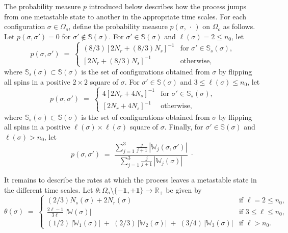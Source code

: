 \documentclass[reqno]{amsart}
\begin{document}
The probability measure $p$ introduced below describes how the process
jumps from one metastable state to another in the appropriate time
scales.  For each configuration $\sigma \in \Omega_o$, define the
probability measure $p(\sigma, \,\cdot\,)$ on $\Omega_o$ as follows.
Let $p(\sigma, \sigma')=0$ for $\sigma'\not\in {{\mathbb S}}(\sigma)$. For
$\sigma'\in {{\mathbb S}}(\sigma)$ and $\ell (\sigma) =2 \le n_0$, let
\begin{equation}
\label{e04}
p(\sigma, \sigma') \;=\;
\begin{cases}
(8/3) [2 N_r + (8/3) N_s]^{-1} & \text{for $\sigma' \in {{\mathbb S}}_s(\sigma)$,} \\
[2 N_r + (8/3) N_s]^{-1} & \text{otherwise,}
\end{cases}
\end{equation}
where ${{\mathbb S}}_s(\sigma) \subset {{\mathbb S}}(\sigma)$ is the set of
configurations obtained from $\sigma$ by flipping all spins in a
positive $2\times 2$ square of $\sigma$. For $\sigma'\in {{\mathbb S}}(\sigma)$ and $3\le \ell (\sigma) \le n_0$, let
\begin{equation}
\label{e05}
p(\sigma, \sigma') \;=\; 
\begin{cases}
4[2 N_r + 4 N_s]^{-1} & \text{for $\sigma' \in {{\mathbb S}}_s(\sigma)$,} \\
[2 N_r + 4 N_s]^{-1} & \text{otherwise,}
\end{cases} 
\end{equation}
where ${{\mathbb S}}_s(\sigma) \subset {{\mathbb S}}(\sigma)$ is the set of
configurations obtained from $\sigma$ by flipping all spins in a
positive $\ell(\sigma)\times \ell(\sigma)$ square of $\sigma$.
Finally, for $\sigma'\in {{\mathbb S}}(\sigma)$ and $\ell(\sigma)>n_0$, let
\begin{equation}
\label{e06}
p(\sigma, \sigma') \;=\; \frac{\sum_{j=1}^3 \frac j{j+1} \,
|{{\mathbb W}}_j (\sigma, \sigma')|} {\sum_{j=1}^3 \frac j{j+1} \,
|{{\mathbb W}}_j(\sigma)|}\;\cdot
\end{equation}

It remains to describe the rates at which the process leaves a
metastable state in the different time scales.  Let
$\theta:\Omega_o\setminus \{- {{\mathbf 1}}, +{{\mathbf 1}}\}\to{{\mathbb R}}_+$ be given by
\begin{equation}
\label{e07}
\theta(\sigma) \;=\;
\begin{cases}
(2/3) N_s(\sigma) + 2 N_r(\sigma) & \text{if $\ell =2\le n_0$,} \\
\frac{2\ell -1}{3\ell} \, |{{\mathbb W}}(\sigma)| & \text{if $3\le \ell \le
  n_0$,} \\
(1/2) \, |{{\mathbb W}}_1(\sigma)| \;+\; (2/3) \, |{{\mathbb W}}_2(\sigma)|
\; +\; (3/4) \, |{{\mathbb W}}_3(\sigma)| & \text{if $\ell > n_0$.} 
\end{cases}
\end{equation}
\end{document}
